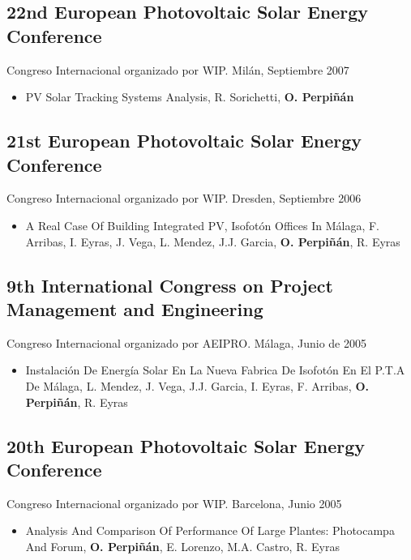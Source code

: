 \documentclass[article, a4paper]{memoir}
\begin{document}
\subsection{22nd European Photovoltaic Solar Energy Conference}
\label{sec:orgcd637b8}
Congreso Internacional organizado por WIP. Milán, Septiembre 2007

\begin{itemize}
\item PV Solar Tracking Systems Analysis, R. Sorichetti, \textbf{O. Perpiñán}
\end{itemize}

\subsection{21st European Photovoltaic Solar Energy Conference}
\label{sec:org7e7fe68}
Congreso Internacional organizado por WIP. Dresden, Septiembre 2006

\begin{itemize}
\item A Real Case Of Building Integrated PV, Isofotón Offices In Málaga, F. Arribas, I. Eyras, J. Vega, L. Mendez, J.J. Garcia, \textbf{O. Perpiñán}, R. Eyras
\end{itemize}

\subsection{9th International Congress on  Project Management and Engineering}
\label{sec:orgc2fef52}
Congreso Internacional organizado por AEIPRO. Málaga, Junio de 2005

\begin{itemize}
\item Instalación De Energía Solar En La Nueva Fabrica De Isofotón En El P.T.A De Málaga, L. Mendez, J. Vega, J.J. Garcia, I. Eyras, F. Arribas, \textbf{O. Perpiñán}, R. Eyras
\end{itemize}

\subsection{20th European Photovoltaic Solar Energy Conference}
\label{sec:orgeedb5cb}
Congreso Internacional organizado por WIP. Barcelona, Junio 2005

\begin{itemize}
\item Analysis And Comparison Of Performance Of Large Plantes: Photocampa And Forum, \textbf{O. Perpiñán}, E. Lorenzo, M.A. Castro, R. Eyras
\end{itemize}
\end{document}
